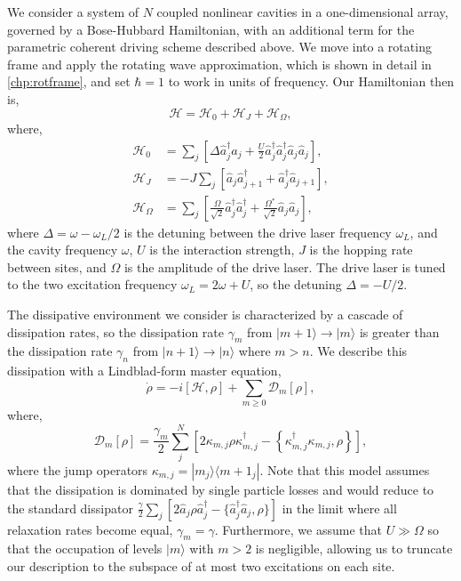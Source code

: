 We consider a system of \(N\) coupled nonlinear cavities in a one-dimensional array, governed by a Bose-Hubbard Hamiltonian, with an additional term for the parametric coherent driving scheme described above. We move into a rotating frame and apply the rotating wave approximation, which is shown in detail in \cref{chp:rotframe}, and set \(\hbar = 1\) to work in units of frequency. Our Hamiltonian then is,
\begin{equation}
	\mathcal{H} = \mathcal{H}_{0} + \mathcal{H}_{J} + \mathcal{H}_{\Omega},
	\label{eq:dnlca2-1}
\end{equation}
where,
\begin{align}
	\mathcal{H}_{0} &= \sum_{j} \left[ \Delta \hat{a}_{j}^{\dagger}\hat{a}_{j} + \frac{U}{2}\hat{a}_{j}^{\dagger}\hat{a}_{j}^{\dagger}\hat{a}_{j}\hat{a}_{j}\right], \label{eq:dnlca2-2} \\
	\mathcal{H}_{J} &= -J \sum_{j}\left[ \hat{a}_{j}\hat{a}_{j+1}^{\dagger} + \hat{a}_{j}^{\dagger}\hat{a}_{j+1} \right], \label{eq:dnlca2-3} \\
	\mathcal{H}_{\Omega} &= \sum_{j} \left[\frac{\Omega}{\sqrt{2}}\hat{a}_{j}^{\dagger}\hat{a}_{j}^{\dagger} + \frac{\Omega^{*}}{\sqrt{2}}\hat{a}_{j}\hat{a}_{j} \right], \label{eq:dnlca2-4}
\end{align}
where \(\Delta = \omega - \omega_{L}/2\) is the detuning between the drive laser frequency \(\omega_{L}\), and the cavity frequency \(\omega\), \(U\) is the interaction strength, \(J\) is the hopping rate between sites, and \(\Omega\) is the amplitude of the drive laser. The drive laser is tuned to the two excitation frequency \(\omega_{L} = 2\omega + U\), so the detuning \(\Delta = -U/2\). 

The dissipative environment we consider is characterized by a cascade of dissipation rates, so the dissipation rate \(\gamma_{m}\) from \(|m+1\rangle \rightarrow |m\rangle\) is greater than the dissipation rate \(\gamma_{n}\) from \(|n+1\rangle \rightarrow |n\rangle\) where \(m > n\). We describe this dissipation with a Lindblad-form master equation,
\begin{equation}
	\dot{\rho} = -i\left[\mathcal{H}, \rho\right] + \sum_{m \geq 0} \mathcal{D}_{m}[\rho],
	\label{eq:dnlca2-5}
\end{equation}
where,
\begin{equation}
	\mathcal{D}_{m} [\rho] = \frac{\gamma_{m}}{2} \sum_{j}^{N} \left[ 2\kappa_{m,j}\rho\kappa_{m,j}^{\dagger} - \left\{\kappa_{m,j}^{\dagger}\kappa_{m,j}, \rho \right\}\right],
	\label{eq:dnlca2-6}
\end{equation}
where the jump operators \(\kappa_{m,j} = |m_{j} \rangle \langle m+1_{j}|\). Note that this model assumes that the dissipation is dominated by single particle losses and would reduce to the standard dissipator \(\frac{\gamma}{2} \sum_{j}\left[2\hat{a}_{j}\rho\hat{a}_{j}^{\dagger} - \{\hat{a}_{j}^{\dagger}\hat{a}_{j}, \rho\}\right]\) in the limit where all relaxation rates become equal, \(\gamma_{m} = \gamma\). Furthermore, we assume that \(U \gg \Omega\) so that the occupation of levels \(|m\rangle\) with \(m > 2\) is negligible, allowing us to truncate our description to the subspace of at most two excitations on each site. 

